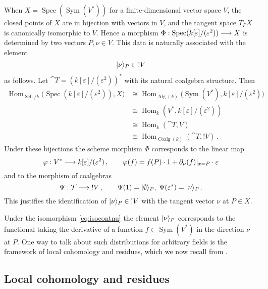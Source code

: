 \documentclass[english,letter paper,12pt,reqno]{article}
\DeclarePairedDelimiter\ket{\lvert}{\rangle}
\theoremstyle{example}
\def\Hom{\operatorname{Hom}}
\def\vacu{\ket{\emptyset}}
\def\be{\begin{equation}}
\def\ee{\end{equation}}
\DeclareMathOperator{\Spec}{Spec}
\DeclareMathOperator{\Sym}{Sym}
\begin{document}
When $X = \Spec(\Sym(V^*))$ for a finite-dimensional vector space $V$, the closed points of $X$ are in bijection with vectors in $V$, and the tangent space $T_P X$ is canonically isomorphic to $V$. Hence a morphism $\Phi: \Spec(k[\varepsilon]/(\varepsilon^2)) \lto X$ is determined by two vectors $P, \nu \in V$. This data is naturally associated with the element
\[
\ket{\nu}_P \in {!} V
\]
as follows. Let $\cat{T} = (k[\varepsilon]/(\varepsilon^2))^*$ with its natural coalgebra structure. Then
\begin{align*}
\Hom_{\operatorname{Sch}/k}\!\big(\Spec(k[\varepsilon]/(\varepsilon^2)), X\big) &\cong \Hom_{\operatorname{Alg}(k)}\!\big(\Sym(V^*), k[\varepsilon]/(\varepsilon^2)\big)\\
&\cong \Hom_{k}(V^*, k[\varepsilon]/(\varepsilon^2))\\
&\cong \Hom_{k}(\cat{T}, V)\\
&\cong \Hom_{\operatorname{Coalg}(k)}(\cat{T}, {!} V)\,.
\end{align*}
Under these bijections the scheme morphism $\Phi$ corresponds to the linear map
\be
\varphi: V^* \lto k[\varepsilon]/(\varepsilon^2)\,, \qquad \varphi(f) = f(P) \cdot 1 + \partial_\nu( f )|_{x=P} \cdot \varepsilon
\ee
and to the morphism of coalgebras
\be\label{eq:app_psiman}
\Psi: \cat{T} \lto {!} V\,, \qquad \Psi( 1 ) = \vacu_P, \; \Psi( \varepsilon^* ) = \ket{ \nu }_P\,.
\ee
This justifies the identification of $\ket{\nu}_P \in {!} V$ with the tangent vector $\nu$ at $P \in X$. 

Under the isomorphism \eqref{eq:isocontnu} the element $\ket{\nu}_P$ corresponds to the functional taking the derivative of a function $f \in \Sym(V^*)$ in the direction $\nu$ at $P$. One way to talk about such distributions for arbitrary fields is the framework of local cohomology and residues, which we now recall from \cite{murfet_coalg}.

\subsection{Local cohomology and residues}\label{section:residues}
\end{document}
